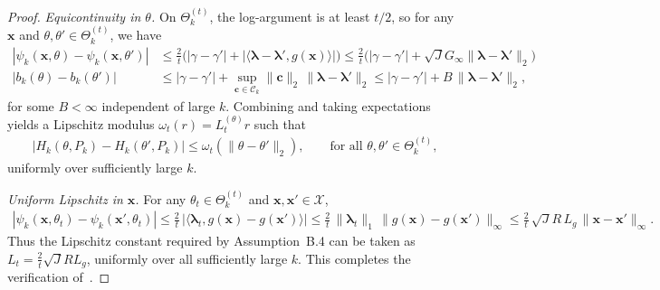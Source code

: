 \documentclass{article}
\theoremstyle{plain}
\theoremstyle{definition}
\newcommand{\calC}{\mathcal C}
\newcommand{\calX}{\mathcal X}
\newcommand{\cvec}{\mathbf{c}}
\newcommand{\xvec}{\mathbf{x}}
\newcommand{\boldlambda}{\boldsymbol{\lambda}}
\begin{document}
\begin{proof}
\emph{Equicontinuity in $\theta$.}
On $\Theta_k^{(t)}$, the log-argument is at least $t/2$, so for any $\xvec$ and $\theta,\theta'\in\Theta_k^{(t)}$, we have 
\begin{align}
|\psi_k(\xvec,\theta)-\psi_k(\xvec,\theta')| &\leq \frac{2}{t}\Big(|\gamma-\gamma'|+|\langle \boldlambda-\boldlambda',g(\xvec)\rangle|\Big) \leq \frac{2}{t}\Big(|\gamma-\gamma'|+\sqrt{J}G_\infty\|\boldlambda-\boldlambda'\|_2\Big) \\
|b_k(\theta)-b_k(\theta')| &\leq |\gamma-\gamma'|+\sup_{\cvec\in\calC_k}\|\cvec\|_2\,\|\boldlambda-\boldlambda'\|_2 \leq |\gamma-\gamma'|+B\,\|\boldlambda-\boldlambda'\|_2,
\end{align}
for some $B<\infty$ independent of large $k$. Combining and taking expectations yields a Lipschitz modulus $\omega_t(r)=L_t^{(\theta)}r$ such that
\begin{align}
|H_k(\theta,P_k)-H_k(\theta',P_k)|\leq \omega_t(\|\theta-\theta'\|_2),
\qquad \text{for all } \theta,\theta'\in\Theta_k^{(t)},
\end{align}
uniformly over sufficiently large $k$.

\emph{Uniform Lipschitz in $\xvec$.}
For any $\theta_t\in\Theta_k^{(t)}$ and $\xvec,\xvec'\in\calX$,
\begin{align}
|\psi_k(\xvec,\theta_t)-\psi_k(\xvec',\theta_t)|
\leq \frac{2}{t}\,|\langle \boldlambda_t,g(\xvec)-g(\xvec')\rangle|
\leq \frac{2}{t}\,\|\boldlambda_t\|_1\,\|g(\xvec)-g(\xvec')\|_\infty
\leq \frac{2}{t}\,\sqrt{J}R\,L_g\,\|\xvec-\xvec'\|_\infty.
\end{align}
Thus the Lipschitz constant required by Assumption~B.4 can be taken as $L_t = \frac{2}{t}\sqrt{J}R L_g$, uniformly over all
sufficiently large $k$. This completes the verification of~. 
\end{proof}
\end{document}

